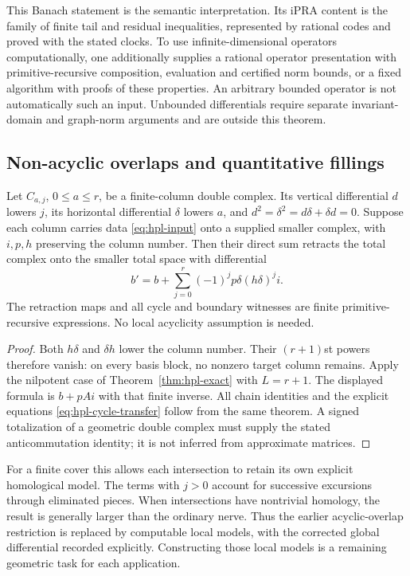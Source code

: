 This Banach statement is the semantic interpretation.  Its iPRA content is
the family of finite tail and residual inequalities, represented by rational
codes and proved with the stated clocks.  To use infinite-dimensional
operators computationally, one additionally supplies a rational operator
presentation with primitive-recursive composition, evaluation and certified
norm bounds, or a fixed algorithm with proofs of these properties.
An arbitrary bounded operator is not automatically such an input.
Unbounded differentials require separate invariant-domain and graph-norm
arguments and are outside this theorem.

\subsection{Non-acyclic overlaps and quantitative fillings}

\begin{corollary}
\label{cor:hpl-bicomplex}
Let $C_{a,j}$, $0\le a\le r$, be a finite-column double complex.  Its
vertical differential $d$ lowers $j$, its horizontal differential $\delta$
lowers $a$, and
$d^2=\delta^2=d\delta+\delta d=0$.  Suppose each column carries data
\eqref{eq:hpl-input} onto a supplied smaller complex, with $i,p,h$
preserving the column number.  Then their direct sum retracts the total
complex onto the smaller total space with differential
\begin{equation}
 b'=b+\sum_{j=0}^{r}(-1)^j p\delta(h\delta)^ji.
 \label{eq:hpl-global}
\end{equation}
The retraction maps and all cycle and boundary witnesses are finite
primitive-recursive expressions.  No local acyclicity assumption is needed.
\end{corollary}

\begin{proof}
Both $h\delta$ and $\delta h$ lower the column number.  Their $(r+1)$st
powers therefore vanish: on every basis block, no nonzero target column
remains.  Apply the nilpotent case of Theorem~\ref{thm:hpl-exact} with
$L=r+1$.  The displayed formula is $b+pAi$ with that finite inverse.
All chain identities and the explicit equations
\eqref{eq:hpl-cycle-transfer} follow from the same theorem.  A signed
totalization of a geometric double complex must supply the stated
anticommutation identity; it is not inferred from approximate matrices.
\end{proof}

For a finite cover this allows each intersection to retain its own explicit
homological model.  The terms with $j>0$ account for successive excursions
through eliminated pieces.  When intersections have nontrivial homology,
the result is generally larger than the ordinary nerve.  Thus the earlier
acyclic-overlap restriction is replaced by computable local models, with
the corrected global differential recorded explicitly.  Constructing those
local models is a remaining geometric task for each application.

